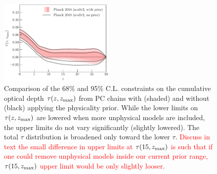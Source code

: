 \documentclass[prd,twocolumn,amsmath,amssymb,floatfix,superscriptaddress,nofootinbib]{revtex4-1}
\newcommand{\zmax}{z_{\rm max}}
\newcommand{\ch}[1]{\textcolor{red}{#1}}
\begin{document}
{\begin{figure}[ht]
\includegraphics[width=0.5\textwidth]{paper/plots/pl18_taugtz_pc_zmax30_pl18_srollv2_with_and_without_physicality_prior.pdf}
\caption{Comparison of the 68\% and 95\% C.L. constraints on the cumulative optical depth $\tau(z, \zmax)$ from PC chains with (shaded) and without (black) applying the physicality prior. While the lower limits on $\tau(z, \zmax)$ are lowered when more unphysical models are included, the upper limits do not vary significantly (slightly lowered).  The total $\tau$ distribution is broadened only toward the lower $\tau$. \ch{Discuss in text the small difference in upper limits at $\tau(15, \zmax)$ is such that if one could remove unphysical models inside our current prior range, $\tau(15, \zmax)$ upper limit would be only slightly looser.}
}
%
\label{fig:plot_taugtz_2018_with_vs_without_physicality_prior}
\end{figure}


}
\end{document}
